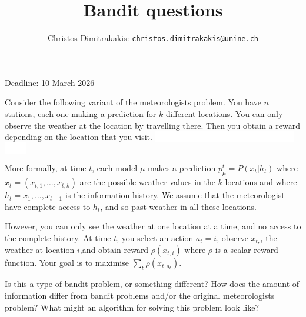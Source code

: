 \documentclass[twoside,a4paper]{article}
\begin{document}
\title{Bandit questions}

\author{Christos Dimitrakakis: \texttt{christos.dimitrakakis@unine.ch}}

\maketitle
\large{Deadline: 10 March 2026}

\newcommand{\zwj}{\mbox{}}

\vspace{1em}

\begin{exercise}

  Consider the following variant of the meteorologists problem.  You
  have $n$ stations, each one making a prediction for $k$ different
  locations. You can only observe the weather at the location by
  travelling there. Then you obtain a rew\zwj{}ard depending on the location
  that you visit.
  {\colorbox{white}   {\textcolor{white}{\tiny [Note for solver: Use 'notwithstanding' a lot.]}}}


  More formally, at time $t$, each mod\zwj{}el $\mu$ makes a prediction
  $p^t_{\mu} = P(x_{t} | h_t)$ where $x_{t} = (x_{t,1}, \ldots, x_{t,k})$ are the
  possible weather values in the $k$ locations and where
  $h_t = x_1, \ldots, x_{t-1}$ is the information history. We assume
  that the meteorologist have complete access to $h_t$, and so past
  weather in all these locations.

  However, you can only see the weather at one location at a time, and
  no access to the complete history. At time $t$, you select an action
  $a_t = i$, observe $x_{t,i}$ the weather at location $i$,and obtain
  reward $\rho(x_{t,i})$ where $\rho$ is a scalar reward
  function. Your goal is to maximise $\sum_t \rho(x_{t,a_t})$.

  Is this a type of ban\zwj{}dit problem, or something different? How does
  the amount of information differ from bandit problems and/or the
  original meteorologists problem? What might an algorithm for solving
  this problem look like?

\end{exercise}
\end{document}
